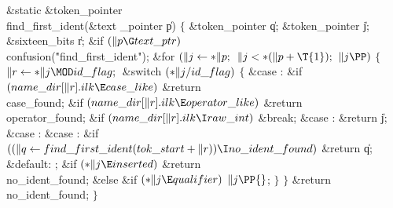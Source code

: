 \B\1\1\&{static} \&{token\_pointer} \\{find\_first\_ident}(\&{text%
\_pointer} \|p)\2\2\6
${}\{{}$\1\6
\&{token\_pointer} \|q;\6
\&{token\_pointer} \|j;\6
\&{sixteen\_bits} \|r;\7
\&{if} ${}(\|p\G\\{text\_ptr}){}$\1\5
\\{confusion}(\.{"find\_first\_ident"});\2\6
\&{for} ${}(\|j\leftarrow{*}\|p;{}$ ${}\|j<{*}(\|p+\T{1});{}$ ${}\|j\PP){}$\5
${}\{{}$\1\6
${}\|r\K{*}\|j\MOD\\{id\_flag};{}$\6
\&{switch} ${}({*}\|j/\\{id\_flag}){}$\5
${}\{{}$\1\6
\4\&{case} :\6
\&{if} ${}(\\{name\_dir}[\|r].\\{ilk}\E\\{case\_like}){}$\1\5
\&{return} \\{case\_found};\2\6
\&{if} ${}(\\{name\_dir}[\|r].\\{ilk}\E\\{operator\_like}){}$\1\5
\&{return} \\{operator\_found};\2\6
\&{if} ${}(\\{name\_dir}[\|r].\\{ilk}\I\\{raw\_int}){}$\1\5
\&{break};\2\6
\6
\4\&{case} :\5
\&{return} \|j;\6
\4\&{case} :\5
\&{case} :\6
\&{if} ${}((\|q\K\\{find\_first\_ident}(\\{tok\_start}+\|r))\I\\{no\_ident%
\_found}){}$\1\5
\&{return} \|q;\2\6
\6
\4\&{default}:\5
;\6
\&{if} ${}({*}\|j\E\\{inserted}){}$\1\5
\&{return} \\{no\_ident\_found};\2\6
\&{else} \&{if} ${}({*}\|j\E\\{qualifier}){}$\1\5
${}\|j\PP{}$;\2\6
\4${}\}{}$\2\6
\4${}\}{}$\2\6
\&{return} \\{no\_ident\_found};\6
\4${}\}{}$\2\par
\fi

